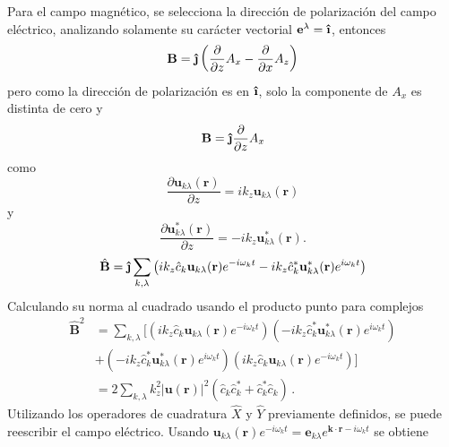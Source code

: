Para el campo magnético, se selecciona la dirección de polarización del campo eléctrico, analizando solamente su carácter vectorial
$\mathbf{e}^{\lambda}= \mathbf{\hat{\textnormal{\bfseries\i}}}$, entonces
\begin{equation}
  \mathbf{B} = \mathbf{\hat{\textnormal{\bfseries\j}}} \left( \frac{\partial}{\partial z} A_x - \frac{\partial}{\partial x} A_z \right)
\end{equation}
pero como la dirección de polarización es en $\mathbf{\hat{\textnormal{\bfseries\i}}}$, solo la componente de $A_x$ es distinta de cero y
\begin{equation}
  \mathbf{B} = \mathbf{\hat{\textnormal{\bfseries\j}}} \frac{\partial}{\partial z} A_x
\end{equation}
como
\begin{equation}
  \frac{\partial \mathbf{u}_{k\lambda}(\mathbf{r})}{\partial z} = i k_z \mathbf{u}_{k\lambda}(\mathbf{r})
\end{equation}
y
\begin{equation}
  \frac{\partial \mathbf{u}^{*}_{k\lambda}(\mathbf{r})}{\partial z} = -i k_z \mathbf{u}^{*}_{k\lambda}(\mathbf{r}).
\end{equation}
\begin{equation}
  \hat{\mathbf{B}} = \mathbf{\hat{\textnormal{\bfseries\j}}} \sum_{k,\lambda} \left( i k_z \hat{c}_{k} \mathbf{u}_{k\lambda}(\mathbf{r})e^{-i\omega_{k} t} - i k_z \hat{c}_{k}^* \mathbf{u}_{k\lambda}^*(\mathbf{r})e^{i\omega_{k} t}  \right)
\end{equation}
Calculando su norma al cuadrado usando el producto punto para complejos
\begin{align}
  \hat{\mathbf{B}}^2 & = \sum_{k,\lambda} \Big[ \left(ik_z \hat{c}_{k} \mathbf{u}_{k\lambda}(\mathbf{r})e^{-i\omega_{k} t}\right)\left(-ik_z \hat{c}_{k}^{*} \mathbf{u}_{k\lambda}^*(\mathbf{r})e^{i\omega_{k} t} \right) \nonumber \\
                     & + \left(-ik_z \hat{c}_{k}^{*} \mathbf{u}_{k\lambda}^*(\mathbf{r})e^{i\omega_{k} t} \right)  \left(ik_z \hat{c}_{k} \mathbf{u}_{k\lambda}(\mathbf{r})e^{-i\omega_{k} t}\right) \Big]                \nonumber \\
                     & = 2 \sum_{k,\lambda} k_z^2 |\mathbf{u}(\mathbf{r})|^2 \left( \hat{c}_{k} \hat{c}_{k}^* + \hat{c}_{k}^* \hat{c}_{k} \right) \,.
\end{align}
Utilizando los operadores de cuadratura $\hat{X}$ y $\hat{Y}$ previamente definidos, se puede reescribir el campo eléctrico. Usando $\mathbf{u}_{k\lambda}(\mathbf{r})e^{-i\omega_k t} = \mathbf{e}_{k\lambda} e^{\mathbf{k}\cdot\mathbf{r}-i\omega_k t}$ se obtiene
